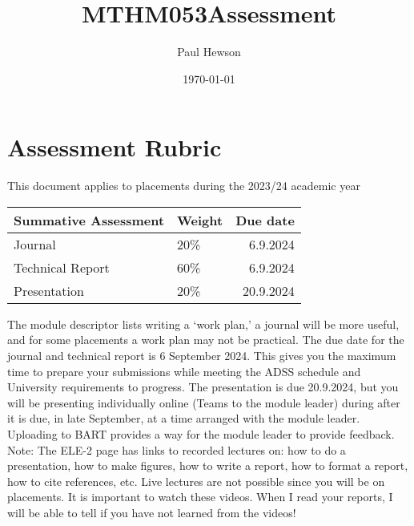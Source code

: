 \documentclass[11pt]{article}
\author{Paul Hewson}
\date{\today}
\title{MTHM053Assessment}
\begin{document}
\maketitle
\tableofcontents



\section{Assessment Rubric}
\label{sec:orgf8e8a64}

This document applies to placements during the 2023/24 academic year

\begin{center}
\begin{tabular}{llr}
Summative Assessment & Weight & Due date\\[0pt]
\hline
Journal & 20\% & 6.9.2024\\[0pt]
Technical Report & 60\% & 6.9.2024\\[0pt]
Presentation & 20\% & 20.9.2024\\[0pt]
\end{tabular}
\end{center}

The module descriptor lists writing a ‘work plan,’ a journal will be more useful, and for some
placements a work plan may not be practical. The due date for the journal and technical
report is 6 September 2024. This gives you the maximum time to prepare your submissions
while meeting the ADSS schedule and University requirements to progress. The
presentation is due 20.9.2024, but you will be presenting individually online (Teams to the
module leader) during after it is due, in late September, at a time arranged with the module
leader. Uploading to BART provides a way for the module leader to provide feedback.
Note: The ELE-2 page has links to recorded lectures on: how to do a presentation, how to
make figures, how to write a report, how to format a report, how to cite references, etc.
Live lectures are not possible since you will be on placements. It is important to watch these
videos. When I read your reports, I will be able to tell if you have not learned from the
videos!
\end{document}
